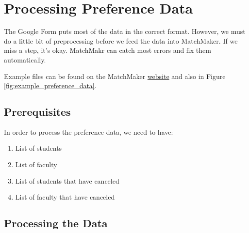 \chapter{Processing Preference Data}

The Google Form puts most of the data in the correct format.  However, we must do a little bit of preprocessing before we feed the data into MatchMaker.  If we miss a step, it's okay.  MatchMakr can catch most errors and fix them automatically.

Example files can be found on the MatchMaker \href{\website}{website} and also in Figure \ref{fig:example_preference_data}.

\section{Prerequisites}

In order to process the preference data, we need to have:
\begin{enumerate}
	\item List of students
	\item List of faculty
	\item List of students that have canceled
	\item List of faculty that have canceled
\end{enumerate}

\section{Processing the Data}


